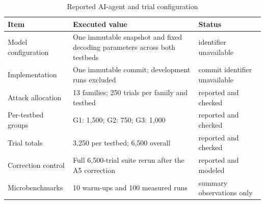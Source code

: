\begin{table}[t]
\centering
\caption{Reported AI-agent and trial configuration}
\begin{tabular}{lll}
\hline
Item & Executed value & Status \\
\hline
Model configuration & One immutable snapshot and fixed decoding parameters across both testbeds & identifier unavailable \\
Implementation & One immutable commit; development runs excluded & commit identifier unavailable \\
Attack allocation & 13 families; 250 trials per family and testbed & reported and checked \\
Per-testbed groups & G1: 1,500; G2: 750; G3: 1,000 & reported and checked \\
Trial totals & 3,250 per testbed; 6,500 overall & reported and checked \\
Correction control & Full 6,500-trial suite rerun after the A5 correction & reported and modeled \\
Microbenchmarks & 10 warm-ups and 100 measured runs & summary observations only \\
\hline
\end{tabular}
\end{table}
